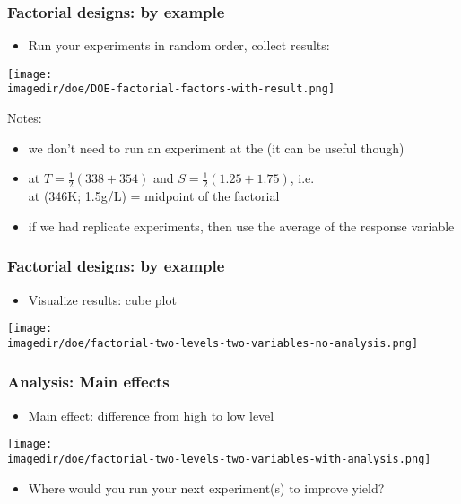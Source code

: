 \begin{frame}\frametitle{Factorial designs: by example}
	\begin{itemize}
		\item	Run your experiments in random order, collect results:
	\end{itemize}
	\begin{center}
		\texttt{[image: \\imagedir/doe/DOE-factorial-factors-with-result.png]}
	\end{center}
	Notes:
	\begin{itemize}
		\item	we don't need to run an experiment at the {\color{purple}{baseline}} (it can be useful though)
		\item	{\color{purple}{baseline}} at $T=\frac{1}{2}\left(338+354\right)$ and $S = \frac{1}{2}\left(1.25+1.75\right)$, i.e. \\
		        {\color{purple}{baseline}} at (346K; 1.5g/L) = midpoint of the factorial
		\item	if we had replicate experiments, then use the average of the response variable
	\end{itemize}
\end{frame}

\begin{frame}\frametitle{Factorial designs: by example}
	\begin{itemize}
		\item	Visualize results: cube plot
	\end{itemize}
	
	\vspace{12pt}
	\begin{center}
		\texttt{[image: \\imagedir/doe/factorial-two-levels-two-variables-no-analysis.png]}
	\end{center}
\end{frame}

\begin{frame}\frametitle{Analysis: Main effects}
	\begin{itemize}
		\item	Main effect: difference from high to low level
	\end{itemize}
	\begin{center}
		\texttt{[image: \\imagedir/doe/factorial-two-levels-two-variables-with-analysis.png]}
	\end{center}
	\begin{itemize}
		\item	Where would you run your next experiment(s) to improve yield?
	\end{itemize}
\end{frame}

